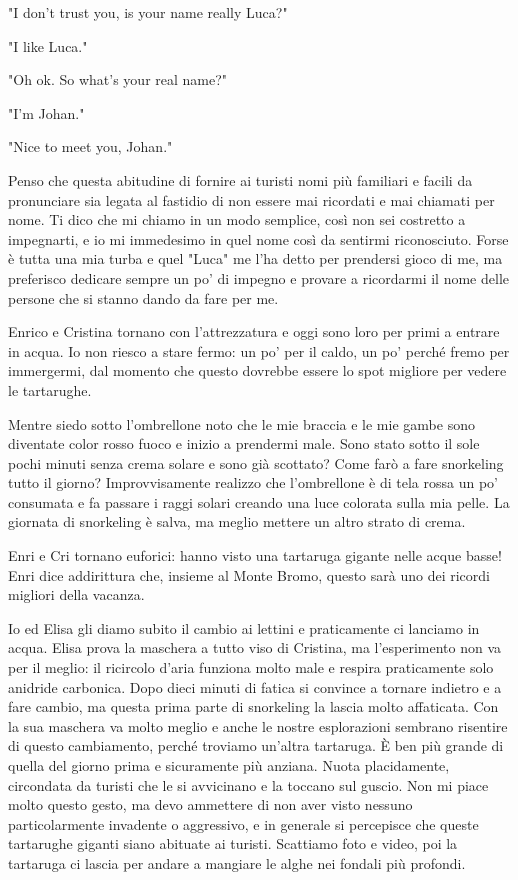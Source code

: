 "I don't trust you, is your name really Luca?" 

"I like Luca." 

"Oh ok. So what's your real name?" 

"I'm Johan." 

"Nice to meet you, Johan."

Penso che questa abitudine di fornire ai turisti nomi più familiari e facili da pronunciare sia legata al fastidio di non essere mai ricordati e mai chiamati per nome. Ti dico che mi chiamo in un modo semplice, così non sei costretto a impegnarti, e io mi immedesimo in quel nome così da sentirmi riconosciuto. Forse è tutta una mia turba e quel "Luca" me l'ha detto per prendersi gioco di me, ma preferisco dedicare sempre un po' di impegno e provare a ricordarmi il nome delle persone che si stanno dando da fare per me.

Enrico e Cristina tornano con l'attrezzatura e oggi sono loro per primi a entrare in acqua. Io non riesco a stare fermo: un po' per il caldo, un po' perché fremo per immergermi, dal momento che questo dovrebbe essere lo spot migliore per vedere le tartarughe.

Mentre siedo sotto l'ombrellone noto che le mie braccia e le mie gambe sono diventate color rosso fuoco e inizio a prendermi male. Sono stato sotto il sole pochi minuti senza crema solare e sono già scottato? Come farò a fare snorkeling tutto il giorno? Improvvisamente realizzo che l'ombrellone è di tela rossa un po' consumata e fa passare i raggi solari creando una luce colorata sulla mia pelle. La giornata di snorkeling è salva, ma meglio mettere un altro strato di crema.

Enri e Cri tornano euforici: hanno visto una tartaruga gigante nelle acque basse! Enri dice addirittura che, insieme al Monte Bromo, questo sarà uno dei ricordi migliori della vacanza.

Io ed Elisa gli diamo subito il cambio ai lettini e praticamente ci lanciamo in acqua. Elisa prova la maschera a tutto viso di Cristina, ma l'esperimento non va per il meglio: il ricircolo d'aria funziona molto male e respira praticamente solo anidride carbonica. Dopo dieci minuti di fatica si convince a tornare indietro e a fare cambio, ma questa prima parte di snorkeling la lascia molto affaticata. Con la sua maschera va molto meglio e anche le nostre esplorazioni sembrano risentire di questo cambiamento, perché troviamo un'altra tartaruga. È ben più grande di quella del giorno prima e sicuramente più anziana. Nuota placidamente, circondata da turisti che le si avvicinano e la toccano sul guscio. Non mi piace molto questo gesto, ma devo ammettere di non aver visto nessuno particolarmente invadente o aggressivo, e in generale si percepisce che queste tartarughe giganti siano abituate ai turisti. Scattiamo foto e video, poi la tartaruga ci lascia per andare a mangiare le alghe nei fondali più profondi.

